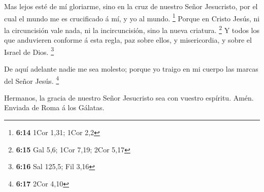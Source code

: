  Mas lejos esté de mí gloriarme, sino en la cruz de nuestro
Señor Jesucristo, por el cual el mundo me es crucificado á mí, y yo al
mundo. \footnote{\textbf{6:14} 1Cor 1,31; 1Cor 2,2}  Porque
en Cristo Jesús, ni la circuncisión vale nada, ni la incircuncisión,
sino la nueva criatura. \footnote{\textbf{6:15} Gal 5,6; 1Cor 7,19; 2Cor
  5,17}  Y todos los que anduvieren conforme á esta regla,
paz sobre ellos, y misericordia, y sobre el Israel de Dios. \footnote{\textbf{6:16}
  Sal 125,5; Fil 3,16}

 De aquí adelante nadie me sea molesto; porque yo traigo en
mi cuerpo las marcas del Señor Jesús. \footnote{\textbf{6:17} 2Cor 4,10}

 Hermanos, la gracia de nuestro Señor Jesucristo sea con
vuestro espíritu. Amén. Enviada de Roma á los Gálatas.
